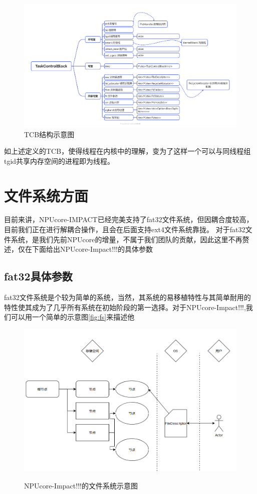 \begin{figure}[h]
    \centering
    \includegraphics[width=1\linewidth]{figs/TCBBlock.png}
    \caption{TCB结构示意图}
    \label{TCB结构示意图}
\end{figure}

如上述定义的TCB，使得线程在内核中的理解，变为了这样一个可以与同线程组tgid共享内存空间的进程即为线程。

\section{文件系统方面}

目前来讲，NPUcore-IMPACT已经完美支持了fat32文件系统，但因耦合度较高，目前我们正在进行解耦合操作，且会在后面支持ext4文件系统靠拢。
对于fat32文件系统，是我们先前NPUcore的增量，不属于我们团队的贡献，因此这里不再赘述，仅在下面给出NPUcore-Impact!!!的具体参数

\subsection{fat32具体参数}

fat32文件系统是个较为简单的系统，当然，其系统的易移植特性与其简单耐用的特性使其成为了几乎所有系统在初始阶段的第一选择。对于NPUcore-Impact!!!,我们可以用一个简单的示意图\autoref{fig:fs}来描述他

\begin{figure}[htb]
    \centering
    \includegraphics[width=1\linewidth]{figs/dirt.PNG}
    \label{fig:fs}
    \caption{NPUcore-Impact!!!的文件系统示意图}
\end{figure}

